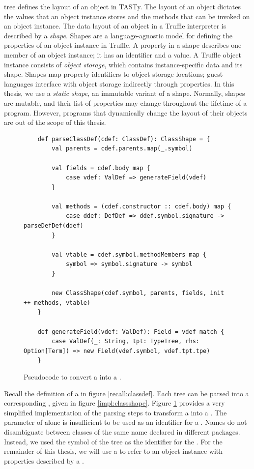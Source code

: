  tree defines the layout of an object in TASTy.
The layout of an object dictates the values that an object instance stores and the methods that can be invoked on an object instance.
The data layout of an object in a Truffle interpreter is described by a \textit{shape}\cite{self:prototypes,truffle:object-model}.
Shapes are a language-agnostic model for defining the properties of an object instance in Truffle.
A property in a shape describes one member of an object instance; it has an identifier and a value.
A Truffle object instance consists of \textit{object storage}, which contains instance-specific data and its shape.
Shapes map property identifiers to object storage locations; guest languages interface with object storage indirectly through properties.
In this thesis, we use a \textit{static shape}, an immutable variant of a shape.
Normally, shapes are mutable, and their list of properties may change throughout the lifetime of a program\cite{truffleruby:object-model}.
However, programs that dynamically change the layout of their objects\cite{java:reflection} are out of the scope of this thesis.

\begin{figure}[!htb]
	\begin{verbatim}
	def parseClassDef(cdef: ClassDef): ClassShape = {
		val parents = cdef.parents.map(_.symbol)
		
		val fields = cdef.body map {
			case vdef: ValDef => generateField(vdef)	
		}
		
		val methods = (cdef.constructor :: cdef.body) map {
			case ddef: DefDef => ddef.symbol.signature -> parseDefDef(ddef)
		}
		
		val vtable = cdef.symbol.methodMembers map {
			symbol => symbol.signature -> symbol
		}
	
		new ClassShape(cdef.symbol, parents, fields, init ++ methods, vtable)
	}

	def generateField(vdef: ValDef): Field = vdef match {
		case ValDef(_: String, tpt: TypeTree, rhs: Option[Term]) => new Field(vdef.symbol, vdef.tpt.tpe)
	}
	\end{verbatim}
	\caption{Pseudocode to convert a  into a .}
	\label{impl:parse-classdef}
\end{figure}

Recall the definition of a  in figure \ref{recall:classdef}.
Each  tree can be parsed into a corresponding , given in figure \ref{impl:classshape}.
Figure \ref{impl:parse-classdef} provides a very simplified implementation of the parsing steps to transform a  into a .
The  parameter of  alone is insufficient to be used as an identifier for a .
Names do not disambiguate between classes of the same name declared in different packages.
Instead, we used the symbol of the  tree as the identifier for the .
For the remainder of this thesis, we will use a  to refer to an object instance with properties described by a .

